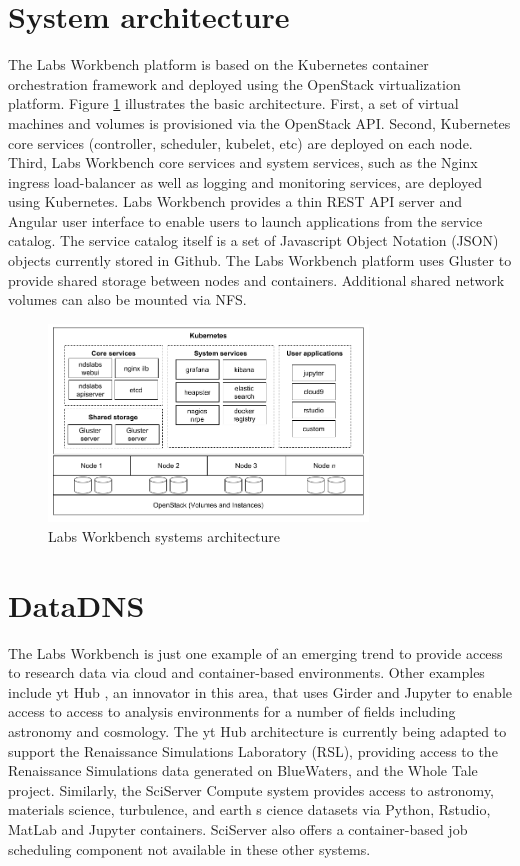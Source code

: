 \documentclass{sig-alternate}
\begin{document}
\section{System architecture}

The Labs Workbench platform is based on the Kubernetes container orchestration framework and  deployed using the OpenStack virtualization platform. Figure \ref{fig.arch} illustrates the basic architecture. First, a set of virtual machines and volumes is provisioned via the OpenStack API. Second, Kubernetes core services (controller, scheduler, kubelet, etc) are deployed on each node. Third, Labs Workbench core services and system services, such as the Nginx ingress load-balancer as well as logging and monitoring services, are deployed using Kubernetes. Labs Workbench provides a thin REST API server and Angular user interface to enable users to launch applications from the service catalog. The service catalog itself is a set of Javascript Object Notation (JSON) objects currently stored in Github. The Labs Workbench platform uses Gluster to provide shared storage between nodes and containers. Additional shared network volumes can also be mounted via NFS.

\begin{figure}[!ht]
\centering
\includegraphics[width=8.5cm]{architecture.png}
\caption{Labs Workbench systems architecture}
\label{fig.arch}
\end{figure}



\section{DataDNS}

The Labs Workbench is just one example of an emerging trend to provide access to research data via cloud and container-based environments.  Other examples include yt Hub \cite{smith2011}, an innovator in this area, that uses Girder and Jupyter to enable access to access to analysis environments for a number of fields including astronomy and cosmology.  The yt Hub architecture is currently being adapted to support the Renaissance Simulations Laboratory (RSL), providing access to the Renaissance Simulations data generated on BlueWaters, and the Whole Tale project.  Similarly, the SciServer Compute system provides access to astronomy, materials science, turbulence, and earth s	cience datasets via Python, Rstudio, MatLab and Jupyter containers.  SciServer also offers a container-based job scheduling component not available in these other systems.
\end{document}
